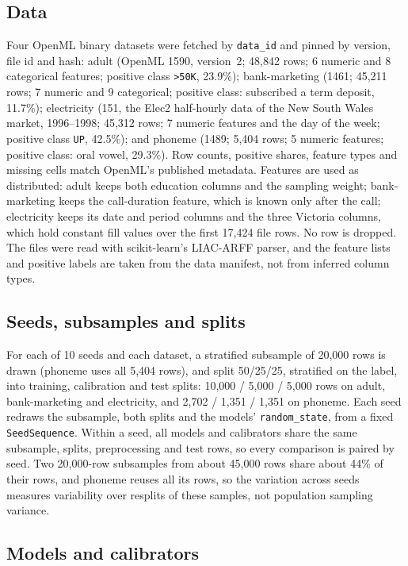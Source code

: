 \documentclass[11pt]{article}
\newcommand{\ds}[1]{\textsf{#1}}
\newcommand{\ad}{\ds{adult}}
\newcommand{\bm}{\ds{bank-marketing}}
\newcommand{\el}{\ds{electricity}}
\newcommand{\ph}{\ds{phoneme}}
\begin{document}
\subsection{Data}
\label{sec:data}

Four OpenML binary datasets were fetched by \texttt{data\_id} and pinned by version, file id
and hash:
\ad{} (OpenML 1590, version~2; 48,842 rows; 6 numeric and 8 categorical features; positive
class \texttt{>50K}, 23.9\%);
\bm{} (1461; 45,211 rows; 7 numeric and 9 categorical; positive class: subscribed a term
deposit, 11.7\%);
\el{} (151, the Elec2 half-hourly data of the New South Wales market, 1996--1998; 45,312
rows; 7 numeric features and the day of the week; positive class \texttt{UP}, 42.5\%);
and \ph{} (1489; 5,404 rows; 5 numeric features; positive class: oral vowel, 29.3\%).
Row counts, positive shares, feature types and missing cells match OpenML's published
metadata. Features are used as distributed: \ad{} keeps both education columns and the
sampling weight; \bm{} keeps the call-duration feature, which is known only after the call;
\el{} keeps its date and period columns and the three Victoria columns, which hold constant
fill values over the first 17,424 file rows. No row is dropped. The files were read with
scikit-learn's LIAC-ARFF parser, and the feature lists and positive labels are taken from the
data manifest, not from inferred column types.

\subsection{Seeds, subsamples and splits}
\label{sec:splits}

For each of 10 seeds and each dataset, a stratified subsample of 20,000 rows is drawn
(\ph{} uses all 5,404 rows), and split 50/25/25, stratified on the label, into training,
calibration and test splits: 10,000 / 5,000 / 5,000 rows on \ad, \bm{} and \el, and 2,702 /
1,351 / 1,351 on \ph. Each seed redraws the subsample, both splits and the models'
\texttt{random\_state}, from a fixed \texttt{SeedSequence}. Within a seed, all models and
calibrators share the same subsample, splits, preprocessing and test rows, so every
comparison is paired by seed. Two 20,000-row subsamples from about 45,000 rows share about
44\% of their rows, and \ph{} reuses all its rows, so the variation across seeds measures
variability over resplits of these samples, not population sampling variance.

\subsection{Models and calibrators}
\label{sec:models}
\end{document}
